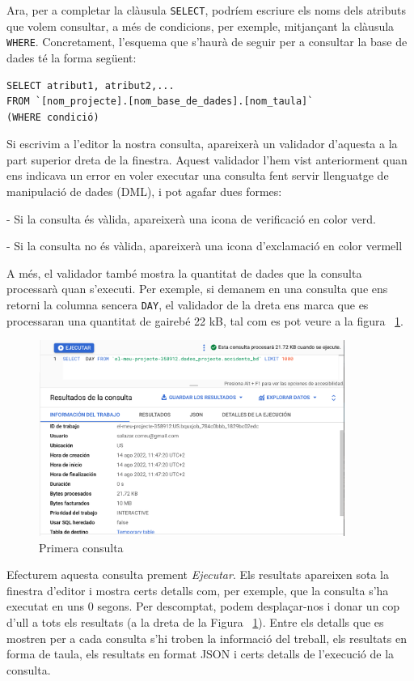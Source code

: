 \documentclass[12pt,longbibliography]{article}
\theoremstyle{definition}
\theoremstyle{remark}
\begin{document}
Ara, per a completar la clàusula \verb|SELECT|, podríem escriure els noms dels atributs que volem consultar, a més de condicions, per exemple, mitjançant la clàusula \verb|WHERE|. Concretament, l'esquema que s'haurà de seguir per a consultar la base de dades té la forma següent:


\begin{verbatim}
SELECT atribut1, atribut2,...
FROM `[nom_projecte].[nom_base_de_dades].[nom_taula]`
(WHERE condició)
\end{verbatim}



Si escrivim a l’editor la nostra consulta, apareixerà un validador d’aquesta a la part superior dreta de la finestra. Aquest validador l'hem vist anteriorment quan ens indicava un error en voler executar una consulta fent servir llenguatge de manipulació de dades (DML), i pot agafar dues formes:

- Si la consulta és vàlida, apareixerà una icona de verificació en color verd.

- Si la consulta no és vàlida, apareixerà una icona d’exclamació en color vermell

A més, el validador també mostra la quantitat de dades que la consulta processarà quan s’executi. Per exemple, si demanem en una consulta que ens retorni la columna sencera \verb|DAY|, el validador de la dreta ens marca que es processaran una quantitat de gairebé 22 kB, tal com es pot veure a la figura ~\ref{fig:bq19}.


\begin{figure}[h!]
\begin{center}
\includegraphics[width=10cm]{bq19}
\end{center}
\caption{Primera consulta}
\label{fig:bq19}
\end{figure}


Efecturem aquesta consulta prement \textit{Ejecutar}. Els resultats apareixen sota la finestra d'editor i mostra certs detalls com, per exemple, que la consulta s'ha executat en uns 0 segons. Per descomptat, podem desplaçar-nos i donar un cop d'ull a tots els resultats (a la dreta de la Figura ~\ref{fig:bq19}). Entre els detalls que es mostren per a cada consulta s'hi troben la informació del treball, els resultats en forma de taula, els resultats en format JSON i certs detalls de l'execució de la consulta. 
\end{document}
